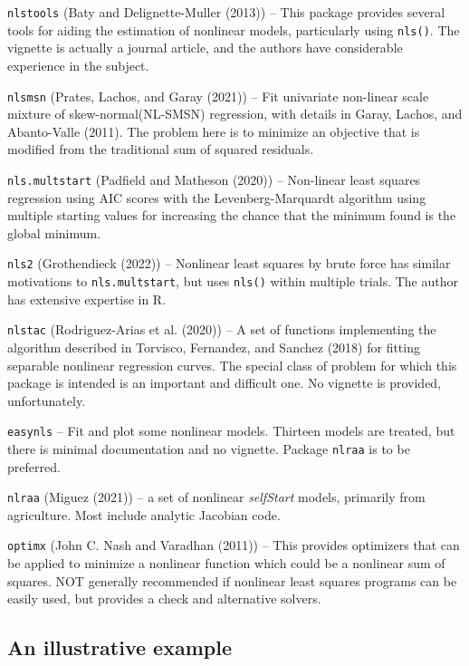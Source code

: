 \texttt{nlstools} (Baty and Delignette-Muller (2013)) -- This package provides several tools for aiding the estimation
of nonlinear models, particularly using \texttt{nls()}. The vignette is actually a journal
article, and the authors have considerable experience in the subject.

\texttt{nlsmsn} (Prates, Lachos, and Garay (2021)) -- Fit univariate non-linear scale mixture of skew-normal(NL-SMSN)
regression, with details in Garay, Lachos, and Abanto-Valle (2011). The problem
here is to minimize an objective that is modified from the traditional sum of squared
residuals.

\texttt{nls.multstart} (Padfield and Matheson (2020)) -- Non-linear least squares regression using
AIC scores with the Levenberg-Marquardt algorithm using multiple starting values
for increasing the chance that the minimum found is the global minimum.

\texttt{nls2} (Grothendieck (2022)) -- Nonlinear least squares by brute force has similar
motivations to \texttt{nls.multstart}, but uses \texttt{nls()} within multiple trials. The author
has extensive expertise in R.

\texttt{nlstac} (Rodriguez-Arias et al. (2020)) -- A set of functions implementing the algorithm described in
Torvisco, Fernandez, and Sanchez (2018) for fitting separable nonlinear regression curves. The
special class of problem for which this package is intended is an important and
difficult one. No vignette is provided, unfortunately.

\texttt{easynls} -- Fit and plot some nonlinear models. Thirteen models are treated, but
there is minimal documentation and no vignette. Package \texttt{nlraa} is to be preferred.

\texttt{nlraa} (Miguez (2021)) -- a set of nonlinear \emph{selfStart} models, primarily from
agriculture. Most include analytic Jacobian code.

\texttt{optimx} (John C. Nash and Varadhan (2011)) -- This provides
optimizers that can be applied to minimize a nonlinear function which could be
a nonlinear sum of
squares. NOT generally recommended if nonlinear
least squares programs can be easily used, but provides a check and alternative
solvers.

\subsection{An illustrative example}\label{an-illustrative-example}

